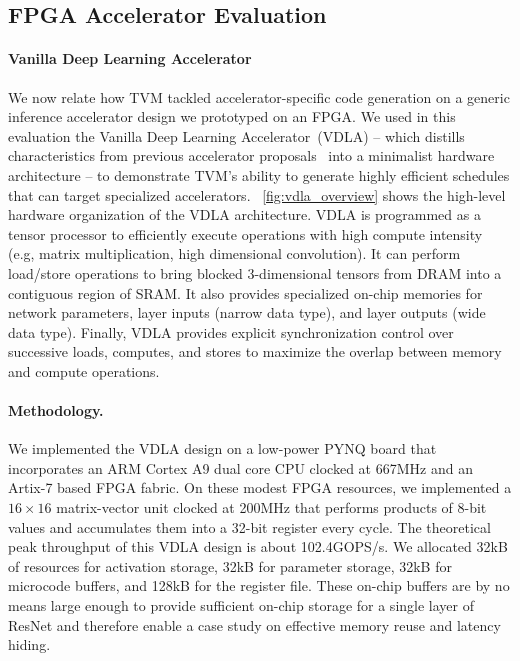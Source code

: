 \documentclass[letterpaper,twocolumn,10pt]{article}
\newcommand{\TensorOpt}{TVM\xspace}
\newcommand{\accel}{VDLA\xspace}
\newcommand{\accelno}{VDLA\xspace}
\newcommand{\accelmeaning}{Vanilla Deep Learning Accelerator}
\begin{document}
\subsection{FPGA Accelerator Evaluation}
\label{sec:fpga_eval}

\paragraph{\accelmeaning}
We now relate how \TensorOpt tackled accelerator-specific code generation on a generic inference accelerator design we prototyped on an FPGA.
We used in this evaluation the \accelmeaning~(\accelno) -- which distills characteristics from previous accelerator proposals~\cite{Liu:PuDianNao, Chen:Eyeriss, Jouppi:TPU} into a minimalist hardware architecture --   to demonstrate \TensorOpt's ability to generate highly efficient schedules that can target specialized accelerators.
~\autoref{fig:vdla_overview} shows the high-level hardware organization of the \accel architecture.
\accel is programmed
as a tensor processor to efficiently execute operations with high compute intensity (e.g, matrix multiplication, high dimensional convolution).
It can perform load/store operations to bring blocked 3-dimensional tensors from DRAM into a contiguous region of SRAM.
It also provides specialized on-chip memories for network parameters, layer inputs (narrow data type), and layer outputs (wide data type).
Finally, \accel provides explicit synchronization control over successive loads, computes, and stores to maximize the overlap between memory and compute operations.

\paragraph{Methodology.}
We implemented the \accel design on a low-power PYNQ board that incorporates an ARM Cortex A9 dual core CPU clocked at 667MHz and an Artix-7 based FPGA fabric.
On these modest FPGA resources, we implemented a $16\times16$ matrix-vector unit clocked at 200MHz that performs products of 8-bit values and accumulates them into a 32-bit register every cycle.
The theoretical peak throughput of this \accel design is about 102.4GOPS/s.
We allocated 32kB of resources for activation storage, 32kB for parameter storage, 32kB for microcode buffers, and 128kB for the register file.
These on-chip buffers are by no means large enough to provide sufficient on-chip storage for a single layer of ResNet and therefore enable a case study on effective memory reuse and latency hiding.
\end{document}

